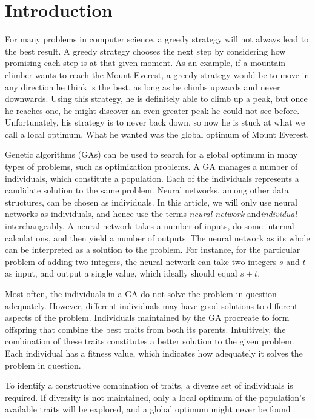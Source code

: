 \section{Introduction}
For many problems in computer science, a greedy strategy will not always lead to the best result. A greedy strategy chooses the next step by considering how promising each step is at that given moment. As an example, if a mountain climber wants to reach the Mount Everest, a greedy strategy would be to move in any direction he think is the best, as long as he climbs upwards and never downwards. Using this strategy, he is definitely able to climb up a peak, but once he reaches one, he might discover an even greater peak he could not see before. Unfortunately, his strategy is to never back down, so now he is stuck at what we call a local optimum. What he wanted was the global optimum of Mount Everest.
 
Genetic algorithms (GAs) can be used to search for a global optimum in many types of problems, such as optimization problems. A GA manages a number of individuals, which constitute a population. Each of the individuals represents a candidate solution to the same problem. Neural networks, among other data structures, can be chosen as individuals.
In this article, we will only use neural networks as individuals, and hence use the terms \emph{neural network} and\emph{individual} interchangeably.
A neural network takes a number of inputs, do some internal calculations, and then yield a number of outputs.
The neural network as its whole can be interpreted as a solution to the problem.
For instance, for the particular problem of adding two integers, the neural network can take two integers $s$ and $t$ as input, and output a single value, which ideally should equal $s + t$.

Most often, the individuals in a GA do not solve the problem in question adequately.
However, different individuals may have good solutions to different aspects of the problem.
Individuals maintained by the GA procreate to form offspring that combine the best traits from both its parents. Intuitively, the combination of these traits constitutes a better solution to the given problem. Each individual has a fitness value, which indicates how adequately it solves the problem in question.

To identify a constructive combination of traits, a diverse set of individuals is required. If diversity is not maintained, only a local optimum of the population's available traits will be explored, and a global optimum might never be found~\cite{ursem2002diversity,Darwen00doesextra}.

